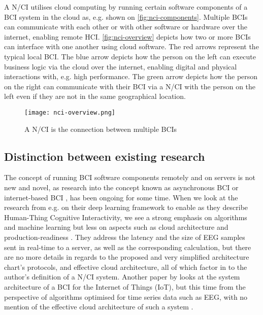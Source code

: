 A N/CI utilises cloud computing by running certain software components of a BCI system in the cloud as, e.g. shown on \autoref{fig:nci-components}. Multiple BCIs can communicate with each other or with other software or hardware over the internet, enabling remote HCI. \autoref{fig:nci-overview} depicts how two or more BCIs can interface with one another using cloud software. The red arrows represent the typical local BCI. The blue arrow depicts how the person on the left can execute business logic via the cloud over the internet, enabling digital and physical interactions with, e.g. high performance. The green arrow depicts how the person on the right can communicate with their BCI via a N/CI with the person on the left even if they are not in the same geographical location.

\begin{figure}[ht]
  \centering
  \texttt{[image: nci-overview.png]}
  \caption{A N/CI is the connection between multiple BCIs}
  \label{fig:nci-overview}
\end{figure}

\subsection{Distinction between existing research}
\label{chapter2-distinction-between-existing-research}

The concept of running BCI software components remotely and on servers is not new and novel, as research into the concept known as asynchronous BCI \citep{an_design_2016} or internet-based BCI \citep{lampe_brain-computer_2014}, has been ongoing for some time. When we look at the research from e.g. \citeauthor{zhang_internet_2018} on their deep learning framework to enable as they describe Human-Thing Cognitive Interactivity, we see a strong emphasis on algorithms and machine learning but less on aspects such as cloud architecture and production-readiness \citep{zhang_internet_2018}. They address the latency and the size of EEG samples sent in real-time to a server, as well as the corresponding calculation, but there are no more details in regards to the proposed and very simplified architecture chart's protocols, and effective cloud architecture, all of which factor in to the author's definition of a N/CI system. Another paper by \citeauthor{ahamad_system_2022} looks at the system architecture of a BCI for the Internet of Things (IoT), but this time from the perspective of algorithms optimised for time series data such as EEG, with no mention of the effective cloud architecture of such a system \citep{ahamad_system_2022}.


